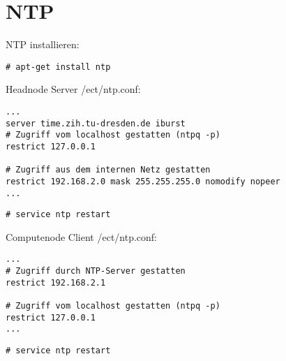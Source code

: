 \chapter{NTP}
NTP installieren:
\begin{lstlisting}[style=Bash]
# apt-get install ntp
\end{lstlisting}
Headnode Server /ect/ntp.conf:
\begin{lstlisting}[style=Bash]
...
server time.zih.tu-dresden.de iburst
# Zugriff vom localhost gestatten (ntpq -p)
restrict 127.0.0.1
 
# Zugriff aus dem internen Netz gestatten
restrict 192.168.2.0 mask 255.255.255.0 nomodify nopeer
...
\end{lstlisting}
\begin{lstlisting}[style=Bash]
# service ntp restart
\end{lstlisting}
Computenode Client /ect/ntp.conf:
\begin{lstlisting}[style=Bash]
...
# Zugriff durch NTP-Server gestatten
restrict 192.168.2.1
 
# Zugriff vom localhost gestatten (ntpq -p)
restrict 127.0.0.1
...
\end{lstlisting}
\begin{lstlisting}[style=Bash]
# service ntp restart
\end{lstlisting}
